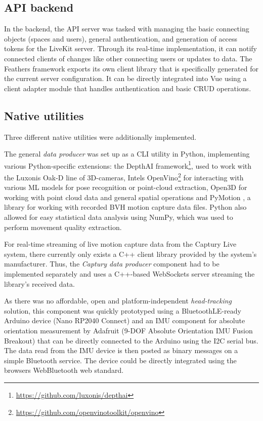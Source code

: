 \subsection{API backend}

In the backend, the \ac{API} server was tasked with managing the basic connecting objects (spaces and users), general authentication, and generation of access tokens for the LiveKit server.
Through its real-time implementation, it can notify connected clients of changes like other connecting users or updates to data.
The Feathers framework exports its own client library that is specifically generated for the current server configuration. It can be directly integrated into Vue using a client adapter module that handles authentication and basic \ac{CRUD} operations.

\subsection{Native utilities}

Three different native utilities were additionally implemented.

The general \emph{data producer} was set up as a \ac{CLI} utility in Python, implementing various Python-specific extensions: the DepthAI framework\footnote{\url{https://github.com/luxonis/depthai}}, used to work with the Luxonis Oak-D line of \ac{3D}-cameras, Intel\textquotesingle s OpenVino\footnote{\url{https://github.com/openvinotoolkit/openvino}} for interacting with various \ac{ML} models for pose recognition or point-cloud extraction, Open3D \parencite{open3DZhou2018} for working with point cloud data and general spatial operations and PyMotion \parencite{githubPyMotion}, a library for working with recorded \ac{BVH} motion capture data files.
Python also allowed for easy statistical data analysis using NumPy, which was used to perform movement quality extraction.

For real-time streaming of live motion capture data from the Captury Live system, there currently only exists a C++ client library provided by the system's manufacturer.
Thus, the \emph{Captury data producer} component had to be implemented separately and uses a C++-based WebSockets server streaming the library's received data.

As there was no affordable, open and platform-independent \emph{head-tracking} solution, this component was quickly prototyped using a BluetoothLE-ready Arduino device (Nano RP2040 Connect) and an \ac{IMU} component for absolute orientation measurement by Adafruit (9-DOF Absolute Orientation IMU Fusion Breakout) that can be directly connected to the Arduino using the \ac{I2C} serial bus.
The data read from the \ac{IMU} device is then posted as binary messages on a simple Bluetooth service.
The device could be directly integrated using the browser\textquotesingle s WebBluetooth web standard.

